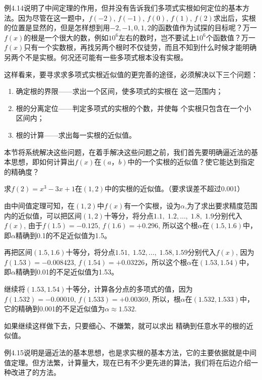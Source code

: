 例4.14说明了中间定理的作用，但并没有告诉我们多项式实根如何定位的基本方法。因为尽管在这一题中，$f(-2)$, $f(-1)$, $f(0)$, $f(1)$, $f(2)$求出后，实根的位置是显然的，但是怎样想到用$-2,-1, 0, 1, 2$的函数值作为试探的目标呢？万一$f(x)$的根是一个很大的数，例如$10^6$左右的数时，岂不要试上$10^6$个函数值？万一$f(x)$只有一个实数根，再找另两个根时不仅徒劳，而且不知到什么时候才能明确另两个不是实根。何况还可能有一些多项式根本没有实根。

这样看来，要寻求求多项式实根近似值的更完善的途径，必须解决以下三个问题：
\begin{enumerate}
\item 确定根的界限——求出一个区间，使多项式的实根在
这一范围内；    
\item 根的分离定位——判定多项式的实根的个数，并使每
个实根只包含在一个小区间内；    
\item 根的计算——求出每一实根的近似值。
\end{enumerate}

本节将系统解决这些问题，在着手解决这些问题之前，我们首先要明确逼近法的基本思想，即如何计算出$f(x)$在$(a，b)$中的一个实根的近似值？使它能达到指定的精确度？

\begin{example}
    求$f(2)=x^3-3x+1$在$(1, 2)$中的实根的近似值。（要求误差不超过0.001）
\end{example}

\begin{solution}
    由中间值定理可知，在$(1, 2)$中$f(x)$有一个实根，设为$\alpha$,为了求出要求精度范围内的近似值，可以把区间$(1, 2)$十等分，将分点$1.1,\; 1.2,\ldots,\; 1.8,\; 1.9$分别代入$f(x)$, 由于$f(1. 5)=-0.125$, $f(1. 6)=+0.296$, 所以这个根$\alpha$在$(1.5, 1. 6)$中，即$\alpha$精确到0.1的不足近似值为1.5。
    
    再把区间$(1.5, 1. 6)$十等分，将分点$1.51,\; 1.52,\ldots,\; 1.58, 1.59$分别代入$f(x)$, 因为$f(1.53)=-0.008423$, $f(1.54)=+0.03226$，所以这个根$\alpha$在$(1.53, 1. 54)$中，即$\alpha$精确到0.01的不足近似值为1.53。

    继续将$(1.53, 1.54)$十等分，计算各分点的多项式的值，因为$f(1. 532)=-0. 00010$, $f(1. 533)=+0.00369$, 所以，根$\alpha$在$(1. 532, 1. 533)$中，它的精确到0.001的不足近似值为$\alpha\approx1.532$.

    如果继续这样做下去，只要细心、不嫌繁，就可以求出
    精确到任意水平的根的近似值。
\end{solution}

    例4.15说明是逼近法的基本思想，也是求实根的基本方法，它的主要依据就是中间值定理。但方法繁，计算量大，现在已有不少更先进的算法，我们将在后边介绍一种改进了的方法。

